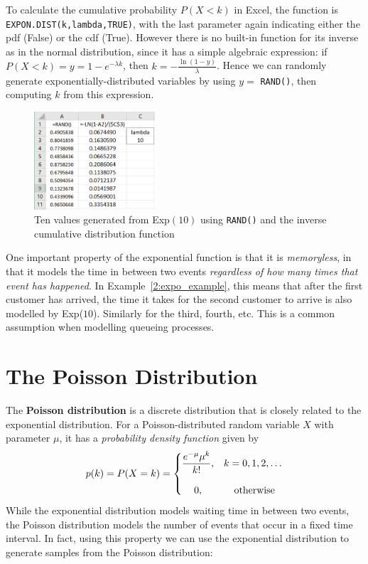 To calculate the cumulative probability $P(X < k)$ in Excel, the function is \\ \texttt{EXPON.DIST(k,lambda,TRUE)}, with the last parameter again indicating either the pdf (False) or the cdf (True).
However there is no built-in function for its inverse as in the normal distribution, since it has a simple algebraic expression: if $P(X < k) = y = 1 - e^{-\lambda k}$, then $k = -\frac{\ln(1-y)}{\lambda}$.
Hence we can randomly generate exponentially-distributed variables by using $y = $ \texttt{RAND()}, then computing $k$ from this expression.

\begin{figure}[htbp]
	\centering
	\includegraphics[width=0.4\textwidth]{fig/2_expo_excel.png}
	\caption{Ten values generated from Exp$(10)$ using \texttt{RAND()} and the inverse cumulative distribution function \label{fig:2_expo_excel}}
\end{figure}

One important property of the exponential function is that it is \emph{memoryless}, in that it models the time in between two events \emph{regardless of how many times that event has happened}.
In Example~\ref{2:expo_example}, this means that after the first customer has arrived, the time it takes for the second customer to arrive is also modelled by Exp($10$).
Similarly for the third, fourth, etc.
This is a common assumption when modelling queueing processes.

\iffalse

\section{The Poisson Distribution}

The \textbf{Poisson distribution} is a discrete distribution that is closely related to the exponential distribution.
For a Poisson-distributed random variable $X$ with parameter $\mu$, it has a \emph{probability density function} given by $$p(k) = P(X = k) = \left\{ \begin{matrix} \dfrac{e^{-\mu}\mu^k}{k!}, & k = 0,1,2,\ldots \cr \cr 0, & \text{ otherwise}\end{matrix} \right.$$
While the exponential distribution models waiting time in between two events, the Poisson distribution models the number of events that occur in a fixed time interval.
In fact, using this property we can use the exponential distribution to generate samples from the Poisson distribution:


